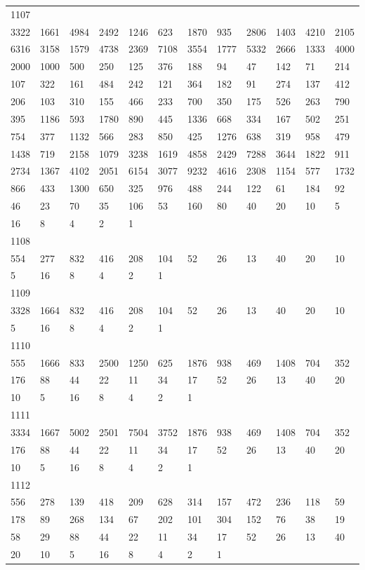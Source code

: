 \begin{longtable}{llllllllllll}
1107&&&&&&&&&&&\\
3322& 1661& 4984& 2492& 1246& 623& 1870& 935& 2806& 1403& 4210& 2105\\
6316& 3158& 1579& 4738& 2369& 7108& 3554& 1777& 5332& 2666& 1333& 4000\\
2000& 1000& 500& 250& 125& 376& 188& 94& 47& 142& 71& 214\\
107& 322& 161& 484& 242& 121& 364& 182& 91& 274& 137& 412\\
206& 103& 310& 155& 466& 233& 700& 350& 175& 526& 263& 790\\
395& 1186& 593& 1780& 890& 445& 1336& 668& 334& 167& 502& 251\\
754& 377& 1132& 566& 283& 850& 425& 1276& 638& 319& 958& 479\\
1438& 719& 2158& 1079& 3238& 1619& 4858& 2429& 7288& 3644& 1822& 911\\
2734& 1367& 4102& 2051& 6154& 3077& 9232& 4616& 2308& 1154& 577& 1732\\
866& 433& 1300& 650& 325& 976& 488& 244& 122& 61& 184& 92\\
46& 23& 70& 35& 106& 53& 160& 80& 40& 20& 10& 5\\
16& 8& 4& 2& 1& \\

1108&&&&&&&&&&&\\
554& 277& 832& 416& 208& 104& 52& 26& 13& 40& 20& 10\\
5& 16& 8& 4& 2& 1& \\

1109&&&&&&&&&&&\\
3328& 1664& 832& 416& 208& 104& 52& 26& 13& 40& 20& 10\\
5& 16& 8& 4& 2& 1& \\

1110&&&&&&&&&&&\\
555& 1666& 833& 2500& 1250& 625& 1876& 938& 469& 1408& 704& 352\\
176& 88& 44& 22& 11& 34& 17& 52& 26& 13& 40& 20\\
10& 5& 16& 8& 4& 2& 1& \\

1111&&&&&&&&&&&\\
3334& 1667& 5002& 2501& 7504& 3752& 1876& 938& 469& 1408& 704& 352\\
176& 88& 44& 22& 11& 34& 17& 52& 26& 13& 40& 20\\
10& 5& 16& 8& 4& 2& 1& \\

1112&&&&&&&&&&&\\
556& 278& 139& 418& 209& 628& 314& 157& 472& 236& 118& 59\\
178& 89& 268& 134& 67& 202& 101& 304& 152& 76& 38& 19\\
58& 29& 88& 44& 22& 11& 34& 17& 52& 26& 13& 40\\
20& 10& 5& 16& 8& 4& 2& 1& \\


\end{longtable}
